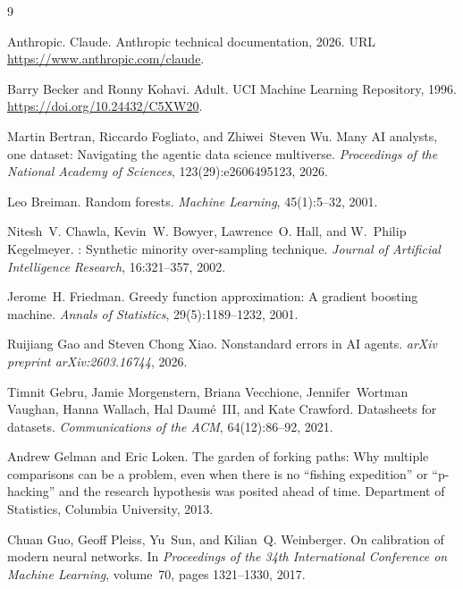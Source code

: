 \documentclass{article}
\begin{document}

\begin{thebibliography}{9}

Anthropic.
\newblock Claude.
\newblock Anthropic technical documentation, 2026.
\newblock URL \url{https://www.anthropic.com/claude}.

Barry Becker and Ronny Kohavi.
\newblock Adult.
\newblock UCI Machine Learning Repository, 1996.
\newblock \url{https://doi.org/10.24432/C5XW20}.

Martin Bertran, Riccardo Fogliato, and Zhiwei~Steven Wu.
\newblock Many AI analysts, one dataset: Navigating the agentic data science multiverse.
\newblock \emph{Proceedings of the National Academy of Sciences}, 123(29):e2606495123, 2026.

Leo Breiman.
\newblock Random forests.
\newblock \emph{Machine Learning}, 45(1):5--32, 2001.

Nitesh~V. Chawla, Kevin~W. Bowyer, Lawrence~O. Hall, and W.~Philip Kegelmeyer.
: Synthetic minority over-sampling technique.
\newblock \emph{Journal of Artificial Intelligence Research}, 16:321--357, 2002.

Jerome~H. Friedman.
\newblock Greedy function approximation: A gradient boosting machine.
\newblock \emph{Annals of Statistics}, 29(5):1189--1232, 2001.

Ruijiang Gao and Steven Chong Xiao.
\newblock Nonstandard errors in AI agents.
\newblock \emph{arXiv preprint arXiv:2603.16744}, 2026.

Timnit Gebru, Jamie Morgenstern, Briana Vecchione, Jennifer~Wortman Vaughan, Hanna Wallach,
Hal Daum{\'e}~III, and Kate Crawford.
\newblock Datasheets for datasets.
\newblock \emph{Communications of the ACM}, 64(12):86--92, 2021.

Andrew Gelman and Eric Loken.
\newblock The garden of forking paths: Why multiple comparisons can be a problem, even when
there is no ``fishing expedition'' or ``p-hacking'' and the research hypothesis was posited
ahead of time.
\newblock Department of Statistics, Columbia University, 2013.

Chuan Guo, Geoff Pleiss, Yu~Sun, and Kilian~Q. Weinberger.
\newblock On calibration of modern neural networks.
\newblock In \emph{Proceedings of the 34th International Conference on Machine Learning},
volume~70, pages 1321--1330, 2017.


\end{thebibliography}
\end{document}

